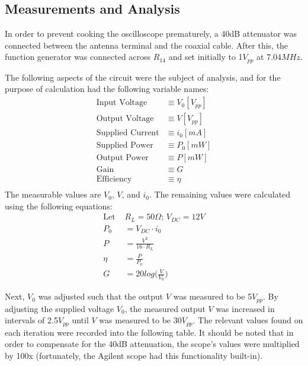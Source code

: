 \subsection{Measurements and Analysis}
In order to prevent cooking the oscilloscope prematurely, a 40dB attenuator was connected
between the antenna terminal and the coaxial cable. After this, the function
generator was connected across $R_{14}$ and set initially to 1$V_{pp}$ at
7.04$MHz$.

The following aspects of the circuit were the subject of analysis, and for
the purpose of calculation had the following variable names: 
\begin{align*}
  \text{Input Voltage} &\equiv        V_0[V_{pp}]\\
  \text{Output Voltage} &\equiv       V[V_{pp}]\\
  \text{Supplied Current} &\equiv     i_0[mA]\\
  \text{Supplied Power} &\equiv       P_0[mW]\\
  \text{Output Power} &\equiv         P[mW]\\
  \text{Gain} &\equiv                 G\\
  \text{Efficiency} &\equiv           \eta\\
\end{align*}
The measurable values are $V_0$, $V$, and $i_0$. The remaining values were
calculated using the following equations:
\begin{align*}
  \text{Let } & R_L=50\Omega;\, V_{DC}=12V\\
  P_0   &=  V_{DC}\cdot i_0\\
  P     &=  \frac{V^2}{16\cdot R_L}\\
  \eta  &=  \frac{P}{P_0}\\
  G     &=  20log \bigg( \frac{V}{V_0} \bigg)
\end{align*}

Next, $V_0$ was adjusted such that the output $V$ was 
measured to be 5$V_{pp}$.
By adjusting the supplied voltage $V_0$, the measured output 
$V$ was increased in intervals of 2.5$V_{pp}$ until $V$ was 
measured to be $30 V_{pp}$.
The relevant values found on each iteration were
recorded into the following table. It should be noted that in 
order to compensate for the 40dB attenuation, the scope's values 
were multiplied by 100x (fortunately, the Agilent scope had this 
functionality built-in).

